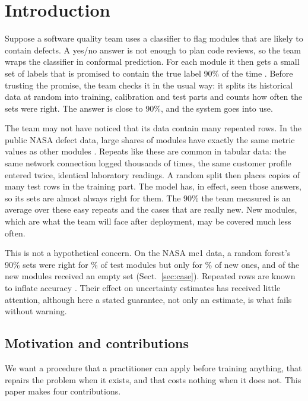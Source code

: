 \section{Introduction}\label{sec:intro}

Suppose a software quality team uses a classifier to flag modules that are likely to contain defects. A yes/no answer is not enough to plan code reviews, so the team wraps the classifier in conformal prediction. For each module it then gets a small set of labels that is promised to contain the true label 90\% of the time \citep{vovk2022,angelopoulos2023}. Before trusting the promise, the team checks it in the usual way: it splits its historical data at random into training, calibration and test parts and counts how often the sets were right. The answer is close to 90\%, and the system goes into use.

The team may not have noticed that its data contain many repeated rows. In the public NASA defect data, large shares of modules have exactly the same metric values as other modules \citep{gray2011,shepperd2013}. Repeats like these are common in tabular data: the same network connection logged thousands of times, the same customer profile entered twice, identical laboratory readings. A random split then places copies of many test rows in the training part. The model has, in effect, seen those answers, so its sets are almost always right for them. The 90\% the team measured is an average over these easy repeats and the cases that are really new. New modules, which are what the team will face after deployment, may be covered much less often.

This is not a hypothetical concern. On the NASA mc1 data, a random forest's 90\% sets were right for \NCsMcOneReported{}\% of test modules but only for \NCsMcOneNew{}\% of new ones, and \NToolStdEmpty{} of the new modules received an empty set (Sect.~\ref{sec:case}). Repeated rows are known to inflate accuracy \citep{kaufman2012,kapoor2023,li2026,roth2026}. Their effect on uncertainty estimates has received little attention, although here a stated guarantee, not only an estimate, is what fails without warning.

\subsection*{Motivation and contributions}

We want a procedure that a practitioner can apply before training anything, that repairs the problem when it exists, and that costs nothing when it does not. This paper makes four contributions.

